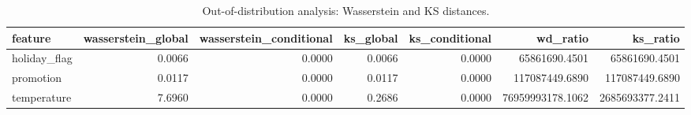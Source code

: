 \begin{table}
\caption{Out-of-distribution analysis: Wasserstein and KS distances.}
\label{tab:01_ood_distances}
\begin{tabular}{lrrrrrr}
\toprule
feature & wasserstein_global & wasserstein_conditional & ks_global & ks_conditional & wd_ratio & ks_ratio \\
\midrule
holiday_flag & 0.0066 & 0.0000 & 0.0066 & 0.0000 & 65861690.4501 & 65861690.4501 \\
promotion & 0.0117 & 0.0000 & 0.0117 & 0.0000 & 117087449.6890 & 117087449.6890 \\
temperature & 7.6960 & 0.0000 & 0.2686 & 0.0000 & 76959993178.1062 & 2685693377.2411 \\
\bottomrule
\end{tabular}
\end{table}

